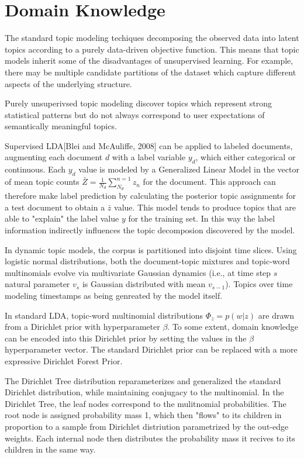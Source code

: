 \section{Domain Knowledge}
\label{sec:approach}

The standard topic modeling techiques decomposing the observed data into latent topics according to a purely data-driven objective function. This means that topic models inherit some of the disadvantages of unsupervised learning. For example, there may be multiple candidate partitions of the dataset which capture different aspects of the underlying structure.

Purely unsuperivsed topic modeling discover topics which represent strong statistical patterns but do not always correspond to user expectations of semantically meaningful topics. 

Supervised LDA[Blei and McAuliffe, 2008] can be applied to labeled documents, augmenting each document $d$ with a label variable $y_d$, which either categorical or continuous. Each $y_d$ value is modeled by a Generalized Linear Model in the vector of mean topic counts $\bar{Z} = \frac{1}{N_d}\sum_{N_d}^{n=1}z_n$ for the document. This approach can therefore make label prediction by calculating the posterior topic assignments for a test document to obtain a $\bar{z}$ value. This model tends to produce topics that are able to "explain" the label value $y$ for the training set. In this way the label information indirectly influences the topic decomposion discovered by the model.

In dynamic topic models, the corpus is partitioned into disjoint time slices. Using logistic normal distributions, both the document-topic mixtures and topic-word multinomials evolve via multivariate Gaussian dynamics (i.e., at time step $s$ natural parameter $v_s$ is Gaussian distributed with mean $v_{s-1}$). Topics over time modeling timestamps as being genreated by the model itself. 

In standard LDA, topic-word multinomial distributions $\Phi_z = p(w|z)$ are drawn from a Dirichlet prior with hyperparameter $\beta$. To some extent, domain knowledge can be encoded into this Dirichlet prior by setting the values in the $\beta$ hyperparameter vector. The standard Dirichlet prior can be replaced with a more expressive Dirichlet Forest Prior.

The Dirichlet Tree distribution reparameterizes and generalized the standard Dirichlet distribution, while maintaining conjugacy to the multinomial. In the Dirichlet Tree, the leaf nodes correspond to the mulitnomial probabilities. The root node is assigned probability mass 1, which then "flows" to its children in proportion to a sample from Dirichlet distriution parametrized by the out-edge weights. Each internal node then distributes the probability mass it recives to its children in the same way.

